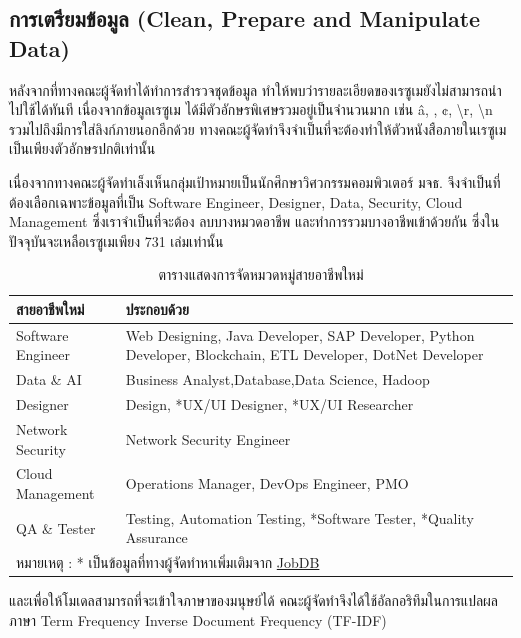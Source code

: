 \subsection{การเตรียมข้อมูล (Clean, Prepare and Manipulate Data)}
\label{subsec:Data Preparation}
หลังจากที่ทางคณะผู้จัดทำได้ทำการสำรวจชุดข้อมูล ทำให้พบว่ารายละเอียดของเรซูเมยังไม่สามารถนำไปใช้ได้ทันที
เนื่องจากข้อมูลเรซูเม ได้มีตัวอักษรพิเศษรวมอยู่เป็นจำนวนมาก เช่น \^a, , ¢, \textbackslash r, \textbackslash n
รวมไปถึงมีการใส่ลิงก์ภายนอกอีกด้วย ทางคณะผู้จัดทำจึงจำเป็นที่จะต้องทำให้ตัวหนังสือภายในเรซูเม เป็นเพียงตัวอักษรปกติเท่านั้น
\par เนื่องจากทางคณะผู้จัดทำเล็งเห็นกลุ่มเป้าหมายเป็นนักศึกษาวิศวกรรมคอมพิวเตอร์ มจธ. จึงจำเป็นที่ต้องเลือกเฉพาะข้อมูลที่เป็น
Software Engineer, Designer, Data, Security, Cloud Management ซึ่งเราจำเป็นที่จะต้อง
ลบบางหมวดอาชีพ และทำการรวมบางอาชีพเข้าด้วยกัน ซึ่งในปัจจุบันจะเหลือเรซูเมเพียง 731 เล่มเท่านั้น

\begin{table}[h]
    \caption{ตารางแสดงการจัดหมวดหมู่สายอาชีพใหม่}
    \label{tab:grouping_data}
    \begin{tabularx}{\textwidth}{l|X}
        สายอาชีพใหม่        & ประกอบด้วย                                                       \\ \hline
        Software Engineer & Web Designing, Java Developer, SAP Developer, Python Developer, Blockchain, ETL Developer, DotNet Developer                            \\\hline
        Data \& AI        & Business Analyst,Database,Data Science, Hadoop                  \\\hline
        Designer          & Design, *UX/UI Designer, *UX/UI Researcher                        \\\hline
        Network Security  & Network Security Engineer                                       \\\hline
        Cloud Management  & Operations Manager, DevOps Engineer, PMO                        \\\hline
        QA \& Tester      & Testing, Automation Testing, *Software Tester, *Quality Assurance \\\hline
        \multicolumn{2}{l}{หมายเหตุ : * เป็นข้อมูลที่ทางผู้จัดทำหาเพิ่มเติมจาก \href{https://th.jobsdb.com/}{JobDB}} \\ \hline
    \end{tabularx}
\end{table}

\par และเพื่อให้โมเดลสามารถที่จะเข้าใจภาษาของมนุษย์ได้ คณะผู้จัดทำจึงได้ใช้อัลกอริทึมในการแปลผลภาษา
Term Frequency Inverse Document Frequency (TF-IDF)


